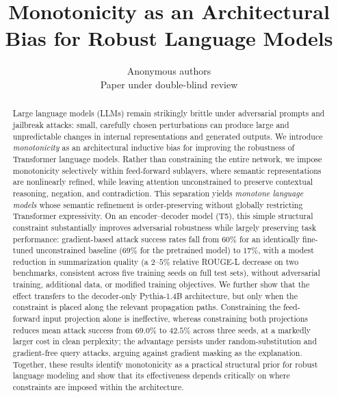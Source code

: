 \documentclass{article}
\title{Monotonicity as an Architectural Bias for Robust Language Models}
\author{Anonymous authors \\ Paper under double-blind review}
\theoremstyle{plain}
\theoremstyle{definition}
\theoremstyle{remark}
\theoremstyle{plain}
\begin{document}
\maketitle

\begin{abstract}

Large language models (LLMs) remain strikingly brittle under adversarial
prompts and jailbreak attacks: small, carefully chosen perturbations can
produce large and unpredictable changes in internal representations and
generated outputs. We introduce \emph{monotonicity} as an architectural
inductive bias for improving the robustness of Transformer language models.
Rather than constraining the entire network, we impose monotonicity selectively
within feed-forward sublayers, where semantic representations are nonlinearly
refined, while leaving attention unconstrained to preserve contextual
reasoning, negation, and contradiction. This separation yields
\emph{monotone language models} whose semantic refinement is order-preserving
without globally restricting Transformer expressivity.
On an encoder--decoder model (T5), this simple structural constraint substantially
improves adversarial robustness while largely preserving task performance:
gradient-based attack success rates fall from $60\%$ for an identically
fine-tuned unconstrained baseline ($69\%$ for the pretrained model) to $17\%$,
with a modest reduction in summarization quality (a $2$--$5\%$ relative ROUGE-L
decrease on two benchmarks, consistent across five training seeds on full test sets), without adversarial
training, additional data, or modified training objectives. We further show that
the effect transfers to the decoder-only Pythia-1.4B architecture, but only when
the constraint is placed along the relevant propagation paths. Constraining the
feed-forward input projection alone is ineffective, whereas constraining both
projections reduces mean attack success from $69.0\%$ to $42.5\%$ across three
seeds, at a markedly larger cost in clean perplexity; the advantage persists
under random-substitution and gradient-free query attacks, arguing against
gradient masking as the explanation. Together, these results identify
monotonicity as a practical structural prior for robust language modeling and
show that its effectiveness depends critically on where constraints are imposed
within the architecture. %

\end{abstract}
\end{document}
